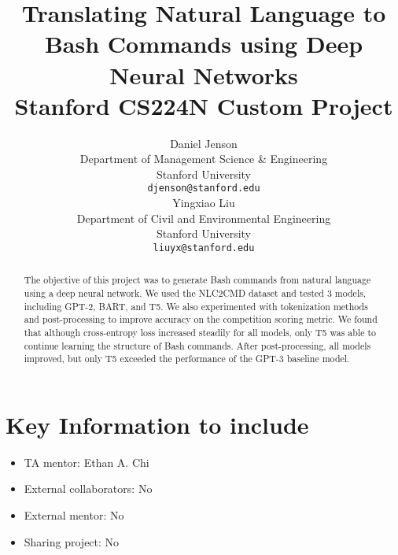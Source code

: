 \documentclass{article}
\title{
  Translating Natural Language to Bash Commands using Deep Neural Networks \\
  \vspace{1em}
  \small{\normalfont Stanford CS224N Custom Project}
}
\author{
 Daniel Jenson \\
  Department of Management Science \& Engineering \\
  Stanford University \\
  \texttt{djenson@stanford.edu} \\
  \And
  Yingxiao Liu \\
  Department of Civil and Environmental Engineering \\
  Stanford University \\
  \texttt{liuyx@stanford.edu} \\
}
\begin{document}
\maketitle

\begin{abstract}
	The objective of this project was to generate Bash commands from natural
	language using a deep neural network. We used the NLC2CMD dataset and tested
	3 models, including GPT-2, BART, and T5. We also experimented with
	tokenization methods and post-processing to improve accuracy on the
	competition scoring metric. We found that although cross-entropy loss
	increased steadily for all models, only T5 was able to continue learning the
	structure of Bash commands. After post-processing, all models improved, but
	only T5 exceeded the performance of the GPT-3 baseline model.
\end{abstract}


\section{Key Information to include}
\begin{itemize}
	\item TA mentor: Ethan A. Chi
	\item External collaborators: No
	\item External mentor: No
	\item Sharing project: No
\end{itemize}



\end{document}
